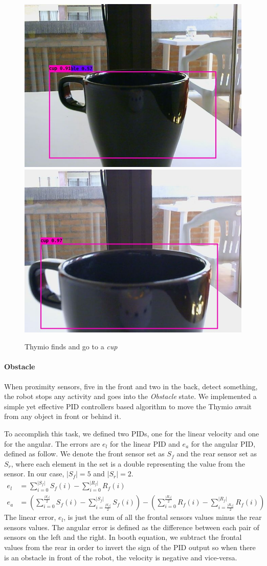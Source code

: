 \documentclass[letterpaper, 10 pt, conference]{ieeeconf}  %
\begin{document}
\begin{figure}[H]
\begin{center}
\end{center}	
\begin{center}
\includegraphics[width=0.48\linewidth]{images/cup/5}	
\includegraphics[width=0.48\linewidth]{images/cup/6}	
\end{center}	
\caption{Thymio finds and go to a \emph{cup}}
\end{figure}

\paragraph{Obstacle} When proximity sensors, five in the front and two in the back, detect something,  the robot stops any activity and goes into the \emph{Obstacle} state. We implemented a simple yet effective PID controllers based algorithm to move the Thymio await from any object in front or behind it. 

To accomplish this task, we defined two PIDs, one for the linear velocity and one for the angular. The errors are $e_l$ for the linear PID and $e_a$ for the angular PID, defined as follow. We denote the front sensor set as $S_f$ and the rear sensor set as $S_r$, where each element in the set is a double representing the value from the sensor. In our case, $|S_f| = 5$ and $|S_r|=2$.
\begin{align*}
	e_l &= \sum\limits_{i=0}^{|S_f|} S_f(i) - \sum\limits_{i = 0}^{|R_f|} R_f(i) \\
	e_a &= (\sum\limits_{i=0}^{\frac{|S_f|}{2}} S_f(i) - \sum\limits_{i = \frac{|S_f|}{2} }^{|S_f|} S_f(i)) - 
	(\sum\limits_{i=0}^{\frac{|R_f|}{2}} R_f(i) - \sum\limits_{i = \frac{|R_f|}{2} }^{|R_f|} R_f(i))
\end{align*}
The linear error, $e_l$, is just the sum of all the frontal sensors values minus the rear sensors values.  The angular error is defined as the difference between each pair of sensors on the left and the right. In booth equation, we subtract the frontal values from the rear in order to invert the sign of the PID output so when there is an obstacle in front of the robot, the velocity is negative and vice-versa. 
\end{document}
